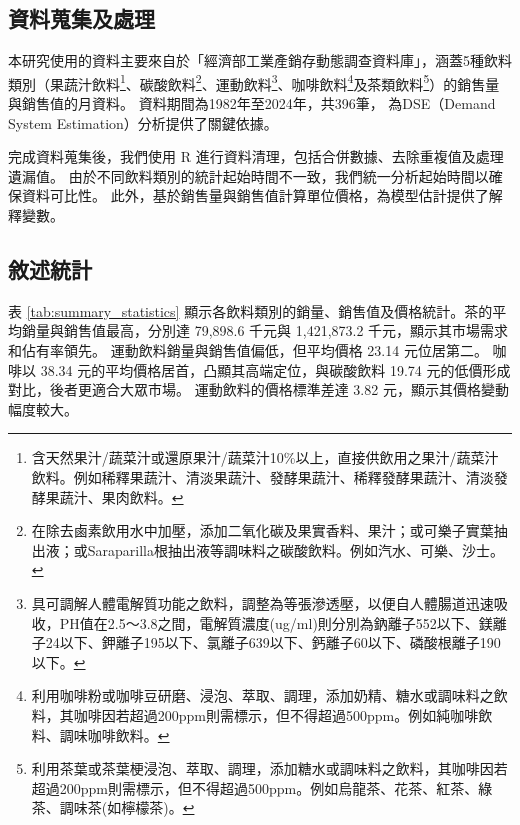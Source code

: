 \subsection{資料蒐集及處理}
本研究使用的資料主要來自於「經濟部工業產銷存動態調查資料庫」\citep{moea_statistics}，涵蓋5種飲料類別（果蔬汁飲料\footnote{含天然果汁/蔬菜汁或還原果汁/蔬菜汁10\%以上，直接供飲用之果汁/蔬菜汁飲料。例如稀釋果蔬汁、清淡果蔬汁、發酵果蔬汁、稀釋發酵果蔬汁、清淡發酵果蔬汁、果肉飲料。
}、碳酸飲料\footnote{在除去鹵素飲用水中加壓，添加二氧化碳及果實香料、果汁；或可樂子實葉抽出液；或Saraparilla根抽出液等調味料之碳酸飲料。例如汽水、可樂、沙士。
}、運動飲料\footnote{具可調解人體電解質功能之飲料，調整為等張滲透壓，以便自人體腸道迅速吸收，PH值在2.5～3.8之間，電解質濃度(ug/ml)則分別為鈉離子552以下、鎂離子24以下、鉀離子195以下、氯離子639以下、鈣離子60以下、磷酸根離子190以下。
}、咖啡飲料\footnote{利用咖啡粉或咖啡豆研磨、浸泡、萃取、調理，添加奶精、糖水或調味料之飲料，其咖啡因若超過200ppm則需標示，但不得超過500ppm。例如純咖啡飲料、調味咖啡飲料。
}及茶類飲料\footnote{利用茶葉或茶葉梗浸泡、萃取、調理，添加糖水或調味料之飲料，其咖啡因若超過200ppm則需標示，但不得超過500ppm。例如烏龍茶、花茶、紅茶、綠茶、調味茶(如檸檬茶)。
}）的銷售量與銷售值的月資料。
資料期間為1982年至2024年，共396筆，
為DSE（Demand System Estimation）分析提供了關鍵依據。

完成資料蒐集後，我們使用 R 進行資料清理，包括合併數據、去除重複值及處理遺漏值。
由於不同飲料類別的統計起始時間不一致，我們統一分析起始時間以確保資料可比性。
此外，基於銷售量與銷售值計算單位價格，為模型估計提供了解釋變數。

\subsection{敘述統計}

表 \ref{tab:summary_statistics} 顯示各飲料類別的銷量、銷售值及價格統計。茶的平均銷量與銷售值最高，分別達 79,898.6 千元與 1,421,873.2 千元，顯示其市場需求和佔有率領先。%
運動飲料銷量與銷售值偏低，但平均價格 23.14 元位居第二。%
咖啡以 38.34 元的平均價格居首，凸顯其高端定位，與碳酸飲料 19.74 元的低價形成對比，後者更適合大眾市場。
運動飲料的價格標準差達 3.82 元，顯示其價格變動幅度較大。%


